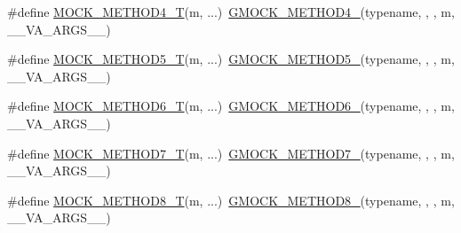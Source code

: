 \begin{DoxyCompactItemize}
\item 
\#define \mbox{\hyperlink{_obj__test_2lib_2googletest-release-1_88_81_2googlemock_2include_2gmock_2gmock-generated-function-mockers_8h_a17dde4ac8109f0bf1b73e3509e42c879}{M\+O\+C\+K\+\_\+\+M\+E\+T\+H\+O\+D4\+\_\+T}}(m, ...)~\mbox{\hyperlink{_obj__test_2lib_2googletest-release-1_88_81_2googlemock_2include_2gmock_2gmock-generated-function-mockers_8h_ab6430f2cfad9de4aca5258ea559294bb}{G\+M\+O\+C\+K\+\_\+\+M\+E\+T\+H\+O\+D4\+\_\+}}(typename, , , m, \+\_\+\+\_\+\+V\+A\+\_\+\+A\+R\+G\+S\+\_\+\+\_\+)
\item 
\#define \mbox{\hyperlink{_obj__test_2lib_2googletest-release-1_88_81_2googlemock_2include_2gmock_2gmock-generated-function-mockers_8h_a3566f9bd057c5cee1841f55cbf685947}{M\+O\+C\+K\+\_\+\+M\+E\+T\+H\+O\+D5\+\_\+T}}(m, ...)~\mbox{\hyperlink{_obj__test_2lib_2googletest-release-1_88_81_2googlemock_2include_2gmock_2gmock-generated-function-mockers_8h_a9e3ecd392499ab19a4a6d3adcabf56f6}{G\+M\+O\+C\+K\+\_\+\+M\+E\+T\+H\+O\+D5\+\_\+}}(typename, , , m, \+\_\+\+\_\+\+V\+A\+\_\+\+A\+R\+G\+S\+\_\+\+\_\+)
\item 
\#define \mbox{\hyperlink{_obj__test_2lib_2googletest-release-1_88_81_2googlemock_2include_2gmock_2gmock-generated-function-mockers_8h_a0d16357a0043d36b167a1c42ef33f672}{M\+O\+C\+K\+\_\+\+M\+E\+T\+H\+O\+D6\+\_\+T}}(m, ...)~\mbox{\hyperlink{_obj__test_2lib_2googletest-release-1_88_81_2googlemock_2include_2gmock_2gmock-generated-function-mockers_8h_ad0ca7f6973a076d0af4c953f8ed91842}{G\+M\+O\+C\+K\+\_\+\+M\+E\+T\+H\+O\+D6\+\_\+}}(typename, , , m, \+\_\+\+\_\+\+V\+A\+\_\+\+A\+R\+G\+S\+\_\+\+\_\+)
\item 
\#define \mbox{\hyperlink{_obj__test_2lib_2googletest-release-1_88_81_2googlemock_2include_2gmock_2gmock-generated-function-mockers_8h_a31bdd1d1448052f4122ecebf937a8f44}{M\+O\+C\+K\+\_\+\+M\+E\+T\+H\+O\+D7\+\_\+T}}(m, ...)~\mbox{\hyperlink{_obj__test_2lib_2googletest-release-1_88_81_2googlemock_2include_2gmock_2gmock-generated-function-mockers_8h_ab98a8399ba62b53b375c2807f4d39d2f}{G\+M\+O\+C\+K\+\_\+\+M\+E\+T\+H\+O\+D7\+\_\+}}(typename, , , m, \+\_\+\+\_\+\+V\+A\+\_\+\+A\+R\+G\+S\+\_\+\+\_\+)
\item 
\#define \mbox{\hyperlink{_obj__test_2lib_2googletest-release-1_88_81_2googlemock_2include_2gmock_2gmock-generated-function-mockers_8h_aa7e6573bb6a57f2a2d3c2875caeffaa3}{M\+O\+C\+K\+\_\+\+M\+E\+T\+H\+O\+D8\+\_\+T}}(m, ...)~\mbox{\hyperlink{_obj__test_2lib_2googletest-release-1_88_81_2googlemock_2include_2gmock_2gmock-generated-function-mockers_8h_aa84a36427c44505207b7cad5dec7ad67}{G\+M\+O\+C\+K\+\_\+\+M\+E\+T\+H\+O\+D8\+\_\+}}(typename, , , m, \+\_\+\+\_\+\+V\+A\+\_\+\+A\+R\+G\+S\+\_\+\+\_\+)

\end{DoxyCompactItemize}
